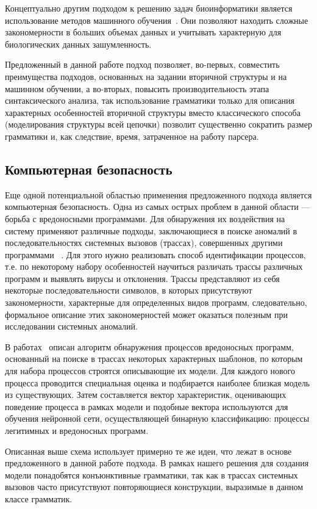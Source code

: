 Концептуально другим подходом к решению задач биоинформатики является использование методов машинного обучения~\cite{ANN,Humidor}. Они позволяют находить сложные закономерности в больших объемах данных и учитывать характерную для биологических данных зашумленность.

Предложенный в данной работе подход позволяет, во-первых, совместить преимущества подходов, основанных на задании вторичной структуры и на машинном обучении, а во-вторых, повысить производительность этапа синтаксического анализа, так использование грамматики только для описания характерных особенностей вторичной структуры вместо классического способа (моделирования структуры всей цепочки) позволит существенно сократить размер грамматики и, как следствие, время, затраченное на работу парсера.

\subsection{Компьютерная безопасность}
Еще одной потенциальной областью применения предложенного подхода является компьютерная безопасность. Одна из самых острых проблем в данной области --- борьба с вредоносными программами. Для обнаружения их воздействия на систему применяют различные подходы, заключающиеся в поиске аномалий в последовательностях системных вызовов (трассах), совершенных другими программами ~\cite{ghosh1999study,hofmeyr1998intrusion,wespi2000intrusion}. Для этого нужно реализовать способ идентификации процессов, т.е. по некоторому набору особенностей научиться различать трассы различных программ и выявлять вирусы и отклонения. Трассы представляют из себя некоторые последовательности символов, в которых присутствуют закономерности, характерные для определенных видов программ, следовательно, формальное описание этих закономерностей может оказаться полезным при исследовании системных аномалий.

В работах~\cite{baklanovsk2015,baklanovsk2016} описан алгоритм обнаружения процессов вредоносных программ, основанный на поиске в трассах некоторых характерных шаблонов, по которым для набора процессов строятся описывающие их модели. Для каждого нового процесса проводится специальная оценка и подбирается наиболее близкая модель из существующих. Затем составляется вектор характеристик, оценивающих поведение процесса в рамках модели и подобные вектора используются для обучения нейронной сети, осуществляющей бинарную классификацию: процессы легитимных и вредоносных программ.

Описанная выше схема использует примерно те же идеи, что лежат в основе предложенного в данной работе подхода. В рамках нашего решения для создания модели понадобятся конъюнктивные грамматики, так как в трассах системных вызовов часто присутствуют повторяющиеся конструкции, выразимые в данном классе грамматик.

